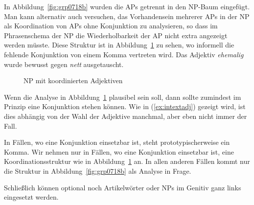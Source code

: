 In Abbildung~\ref{fig:grp0718b} wurden die APs getrennt in den NP-Baum eingefügt.
Man kann alternativ auch versuchen, das Vorhandensein mehrerer APs in der NP als Koordination von APs ohne Konjunktion zu analysieren, so dass im Phrasenschema der NP die Wiederholbarkeit der AP nicht extra angezeigt werden müsste.
Diese Struktur ist in Abbildung~\ref{fig:ngradjkonj} zu sehen, wo informell die fehlende Konjunktion von einem Komma vertreten wird.
Das Adjektiv \textit{ehemalig} wurde bewusst gegen \textit{nett} ausgetauscht.

\begin{figure}
  \centering
  \caption{NP mit koordinierten Adjektiven}
  \label{fig:ngradjkonj}
\end{figure}

Wenn die Analyse in Abbildung~\ref{fig:ngradjkonj} plausibel sein soll, dann sollte zumindest im Prinzip eine Konjunktion stehen können.
Wie in (\ref{ex:intextadj}) gezeigt wird, ist dies abhängig von der Wahl der Adjektive manchmal, aber eben nicht immer der Fall.

\begin{exe}
  \ex\label{ex:intextadj}
  \begin{xlist}
  \end{xlist}
\end{exe}

In Fällen, wo eine Konjunktion einsetzbar ist, steht prototypischerweise ein Komma.
Wir nehmen nur in Fällen, wo eine Konjunktion einsetzbar ist, eine Koordinationsstruktur wie in Abbildung~\ref{fig:ngradjkonj} an.
In allen anderen Fällen kommt nur die Struktur in Abbildung~\ref{fig:grp0718b} als Analyse in Frage.

Schließlich können optional noch Artikelwörter oder NPs im Genitiv ganz links eingesetzt werden.

\begin{exe}
  \ex\label{ex:grp7000}
  \begin{xlist}
  \end{xlist}
\end{exe}

